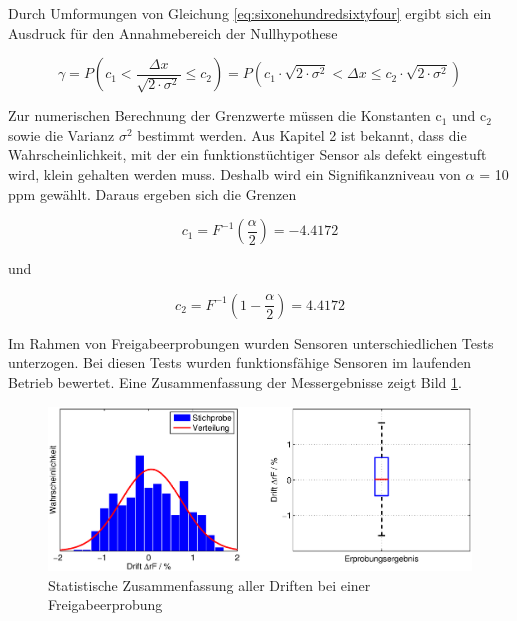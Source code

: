 \noindent Durch Umformungen von Gleichung \eqref{eq:sixonehundredsixtyfour} ergibt sich ein Ausdruck f\"{u}r den Annahmebereich der Nullhypothese

\begin{equation}\label{eq:sixonehundredsixtynine}
\gamma =P\left(c_{1} <\dfrac{\Delta x}{\sqrt{2\cdot \sigma ^{2} } } \le c_{2} \right)=P\left(c_{1} \cdot \sqrt{2\cdot \sigma ^{2} } <\Delta x\le c_{2} \cdot \sqrt{2\cdot \sigma ^{2} } \right)
\end{equation}

\noindent Zur numerischen Berechnung der Grenzwerte m\"{u}ssen die Konstanten c$_{1}$ und c$_{2}$ sowie die Varianz $\sigma^{2}$ bestimmt werden. Aus Kapitel 2 ist bekannt, dass die Wahrscheinlichkeit, mit der ein funktionst\"{u}chtiger Sensor als defekt eingestuft wird, klein gehalten werden muss. Deshalb wird ein Signifikanzniveau von $\alpha$ = 10 ppm gew\"{a}hlt. Daraus ergeben sich die Grenzen

\begin{equation}\label{eq:sixonehundredseventy}
c_{1} =F^{-1} \left(\dfrac{\alpha }{2} \right)=-4.4172
\end{equation}

\noindent und

\begin{equation}\label{eq:sixonehundredseventyone}
c_{2} =F^{-1} \left(1-\dfrac{\alpha }{2} \right)=4.4172
\end{equation}

\noindent Im Rahmen von Freigabeerprobungen wurden Sensoren unterschiedlichen Tests unterzogen. Bei diesen Tests wurden funktionsf\"{a}hige Sensoren im laufenden Betrieb bewertet. Eine Zusammenfassung der Messergebnisse zeigt Bild \ref{fig:DiagnoseFeuchtesensor3}.

\noindent 
\begin{figure}[H]
  \centerline{\includegraphics[width=1\textwidth]{Kapitel6/Bilder/image16}}
  \caption{Statistische Zusammenfassung aller Driften bei einer Freigabeerprobung}
  \label{fig:DiagnoseFeuchtesensor3}
\end{figure}

